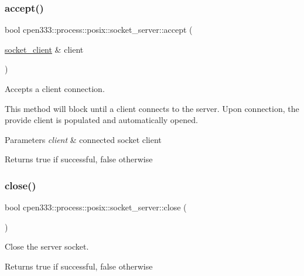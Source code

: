 \subsubsection{\texorpdfstring{accept()}{accept()}}
{\footnotesize\ttfamily bool cpen333\+::process\+::posix\+::socket\+\_\+server\+::accept (\begin{DoxyParamCaption}\item[{\hyperlink{classcpen333_1_1process_1_1posix_1_1socket__client}{socket\+\_\+client} \&}]{client }\end{DoxyParamCaption})\hspace{0.3cm}{\ttfamily [inline]}}



Accepts a client connection. 

This method will block until a client connects to the server. Upon connection, the provide client is populated and automatically opened.


\begin{DoxyParams}{Parameters}
{\em client} & connected socket client \\
\hline
\end{DoxyParams}
\begin{DoxyReturn}{Returns}
true if successful, false otherwise 
\end{DoxyReturn}
\mbox{\label{classcpen333_1_1process_1_1posix_1_1socket__server_a306aea15eb1c856f269b1c3727fbfa17}} 
\subsubsection{\texorpdfstring{close()}{close()}}
{\footnotesize\ttfamily bool cpen333\+::process\+::posix\+::socket\+\_\+server\+::close (\begin{DoxyParamCaption}{ }\end{DoxyParamCaption})\hspace{0.3cm}{\ttfamily [inline]}}



Close the server socket. 

\begin{DoxyReturn}{Returns}
true if successful, false otherwise 
\end{DoxyReturn}
\mbox{\label{classcpen333_1_1process_1_1posix_1_1socket__server_a5962af3110c19660b29f154f867e87e2}} 
